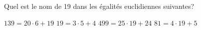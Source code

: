 %
%
Quel est le nom de 19 dans les égalités euclidiennes suivantes?\\
    \begin{tasks}
        \task $139=20\cdot 6+19$
        \task $19=3\cdot 5+4$
        \task $499=25\cdot 19+24$
        \task $81=4\cdot 19+5$
    \end{tasks}
